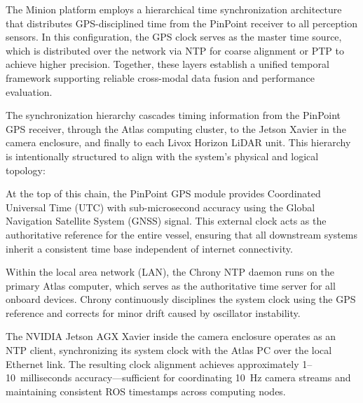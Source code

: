 \documentclass{erauthesis}
\begin{document}
The Minion platform employs a hierarchical time synchronization architecture that distributes GPS-disciplined time from the PinPoint receiver to all perception sensors.
In this configuration, the GPS clock serves as the master time source, which is distributed over the network via \ac{NTP} for coarse alignment or \ac{PTP} to achieve higher precision.
Together, these layers establish a unified temporal framework supporting reliable cross-modal data fusion and performance evaluation.

The synchronization hierarchy cascades timing information from the PinPoint GPS receiver, through the Atlas computing cluster, to the Jetson Xavier in the camera enclosure, and finally to each Livox Horizon LiDAR unit. This hierarchy is intentionally structured to align with the system’s physical and logical topology:


At the top of this chain, the PinPoint GPS module provides Coordinated Universal Time (UTC) with sub-microsecond accuracy using the Global Navigation Satellite System (GNSS) signal. This external clock acts as the authoritative reference for the entire vessel, ensuring that all downstream systems inherit a consistent time base independent of internet connectivity.

Within the local area network (LAN), the Chrony \ac{NTP} daemon runs on the primary Atlas computer, which serves as the authoritative time server for all onboard devices. Chrony continuously disciplines the system clock using the GPS reference and corrects for minor drift caused by oscillator instability.

The NVIDIA Jetson AGX Xavier inside the camera enclosure operates as an \ac{NTP} client, synchronizing its system clock with the Atlas PC over the local Ethernet link. The resulting clock alignment achieves approximately 1–10~milliseconds accuracy—sufficient for coordinating 10~Hz camera streams and maintaining consistent ROS timestamps across computing nodes.
\end{document}
